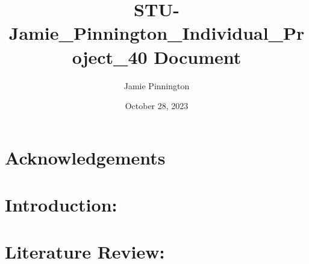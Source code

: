 \documentclass[journal, draftcls]{IEEEtran}
\title{STU-Jamie_Pinnington_Individual_Project_40 Document}
\author{Jamie Pinnington}
\date{October 28, 2023}
\begin{document}


\clearpage %

\begin{abstract}
\end{abstract}

\section*{Acknowledgements}
\clearpage %

\tableofcontents
\clearpage %

\listoffigures
\clearpage %

\listoftables
\clearpage %

\section{Introduction:}

\section{Literature Review:}


\printbibliography

\newpage
\onecolumn
\end{document}
